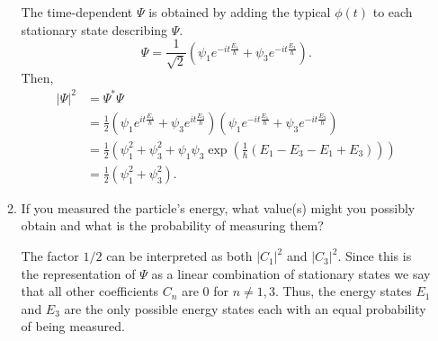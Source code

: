 \documentclass[a4paper, 12pt]{config/homework}
\begin{document}
\begin{enumerate}
\begin{enumerate}[label=(\alph*)]
The time-dependent \(\Psi\) is obtained by adding the typical \(\phi(t)\) to each stationary state describing \(\Psi\).
\[\Psi = \frac{1}{\sqrt{2}} \left(\psi_1 e^{-it \frac{E_1}{\hbar}} + \psi_3e^{-it \frac{E_3}{\hbar}}\right).\]
Then,
\begin{align*}
\left|\Psi\right|^2 &= \Psi^* \Psi
\\&= \frac{1}{2} \left(\psi_1 e^{it \frac{E_1}{\hbar}} + \psi_3e^{it \frac{E_3}{\hbar}}\right) \left(\psi_1 e^{-it \frac{E_1}{\hbar}} + \psi_3e^{-it \frac{E_3}{\hbar}}\right)
\\&= \frac{1}{2} \left( \psi_1^2 + \psi_3^2 + \psi_1\psi_3\exp\left(\frac{1}{\hbar}\left( E_1 - E_3 -E_1 + E_3 \right) \right) \right)
\\&= \frac{1}{2} \left( \psi_1^2 + \psi_3^2 \right).
\end{align*}

\item If you measured the particle's energy, what value(s) might you possibly obtain and what is the probability of measuring them?

The factor \(1/2\) can be interpreted as both \(\left|C_1\right|^2\) and \(\left|C_3\right|^2\). Since this is the representation of \(\Psi\) as a linear combination of stationary states we say that all other coefficients \(C_n\) are 0 for \(n\ne1,3\). Thus, the energy states \(E_1\) and \(E_3\) are the only possible energy states each with an equal probability of being measured.

\end{enumerate}
\end{enumerate}
\end{document}
